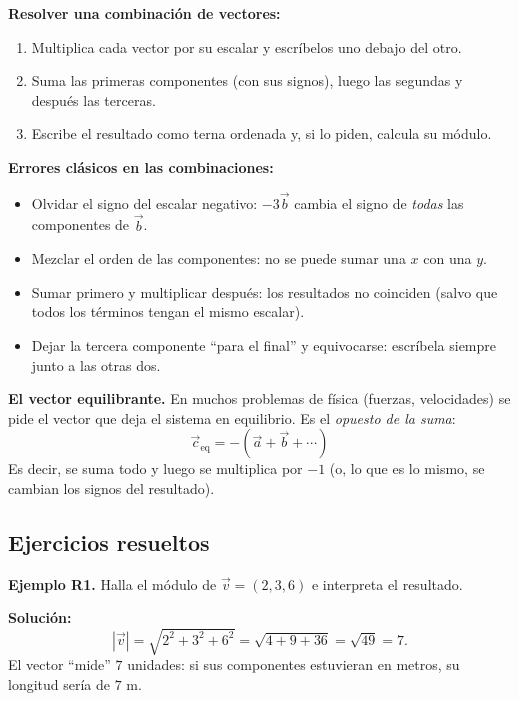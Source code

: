 \documentclass[12pt, letterpaper]{article}
\begin{document}
\begin{cuadropasos}
  \textbf{Resolver una combinación de vectores:}
  \begin{enumerate}[leftmargin=*]
    \item Multiplica cada vector por su escalar y escríbelos uno debajo del otro.
    \item Suma las primeras componentes (con sus signos), luego las segundas y después las terceras.
    \item Escribe el resultado como terna ordenada y, si lo piden, calcula su módulo.
  \end{enumerate}
\end{cuadropasos}

\begin{cuadroadvertencia}
  \textbf{Errores clásicos en las combinaciones:}
  \begin{itemize}[leftmargin=*]
    \item Olvidar el signo del escalar negativo: $-3\vec{b}$ cambia el signo de \emph{todas} las componentes de $\vec{b}$.
    \item Mezclar el orden de las componentes: no se puede sumar una $x$ con una $y$.
    \item Sumar primero y multiplicar después: los resultados no coinciden (salvo que todos los términos tengan el mismo escalar).
    \item Dejar la tercera componente ``para el final'' y equivocarse: escríbela siempre junto a las otras dos.
  \end{itemize}
\end{cuadroadvertencia}

\begin{cuadroextra}
  \textbf{El vector equilibrante.} En muchos problemas de física (fuerzas, velocidades) se pide el vector que deja el sistema en equilibrio. Es el \emph{opuesto de la suma}:
  $$\vec{c}_{\text{eq}} = -(\vec{a} + \vec{b} + \cdots)$$
  Es decir, se suma todo y luego se multiplica por $-1$ (o, lo que es lo mismo, se cambian los signos del resultado).
\end{cuadroextra}

\subsection{Ejercicios resueltos}

\textbf{Ejemplo R1.} Halla el módulo de $\vec{v} = (2, 3, 6)$ e interpreta el resultado.

\begin{cuadrosolucion}
  \textbf{Solución:}
  $$|\vec{v}| = \sqrt{2^2 + 3^2 + 6^2} = \sqrt{4 + 9 + 36} = \sqrt{49} = 7.$$
  El vector ``mide'' $7$ unidades: si sus componentes estuvieran en metros, su longitud sería de $7$ m.
\end{cuadrosolucion}
\end{document}
